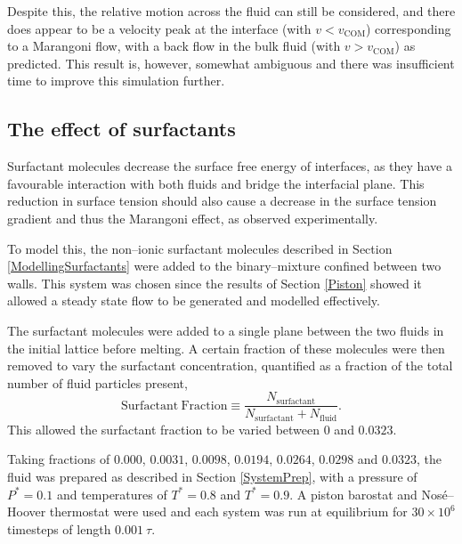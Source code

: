 Despite this, the relative motion across the fluid can still be considered, and there does appear to be a velocity peak at the interface (with $v < v_{\mathrm{COM}}$) corresponding to a Marangoni flow, with a back flow in the bulk fluid (with $v > v_{\mathrm{COM}}$) as predicted.
This result is, however, somewhat ambiguous and there was insufficient time to improve this simulation further.

\subsection{The effect of surfactants}
Surfactant molecules decrease the surface free energy of interfaces, as they have a favourable interaction with both fluids and bridge the interfacial plane.
This reduction in surface tension should also cause a decrease in the surface tension gradient and thus the Marangoni effect, as observed experimentally.\cite{KimSubramanianA,KimSubramanianB,BartonSubramanian,ChenStebe}

To model this, the non--ionic surfactant molecules described in Section \ref{ModellingSurfactants} were added to the binary--mixture confined between two walls.
This system was chosen since the results of Section \ref{Piston} showed it allowed a steady state flow to be generated and modelled effectively.

The surfactant molecules were added to a single plane between the two fluids in the initial lattice before melting.
A certain fraction of these molecules were then removed to vary the surfactant concentration, quantified as a fraction of the total number of fluid particles present,
\begin{equation}
\mathrm{Surfactant\ Fraction} \equiv \frac{N_{\mathrm{surfactant}}}{N_{\mathrm{surfactant}}+N_{\mathrm{fluid}}}.
\end{equation}
This allowed the surfactant fraction to be varied between $0$ and $0.0323$.

Taking fractions of $0.000$, $0.0031$, $0.0098$, $0.0194$, $0.0264$, $0.0298$ and $0.0323$, the fluid was prepared as described in Section \ref{SystemPrep}, with a pressure of $P^{*}=0.1$ and temperatures of $T^{*}=0.8$ and $T^{*}=0.9$.
A piston barostat and Nos\'{e}--Hoover thermostat were used and each system was run at equilibrium for $30 \times 10^{6}$ timesteps of length $0.001\ \tau$.

